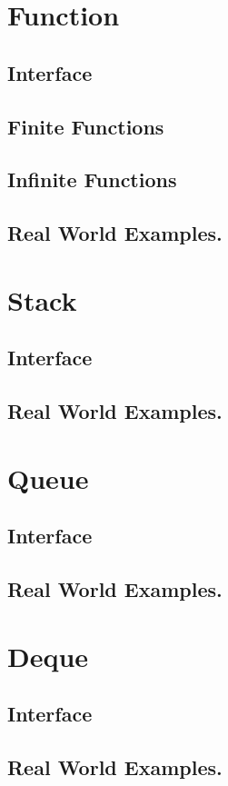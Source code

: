 \documentclass[12pt, letterpaper]{book}
\begin{document}
\section{Function}
	\subsection{Interface}
	\subsection{Finite Functions}
	\subsection{Infinite Functions}
	\subsection{Real World Examples.}
\section{Stack}
	\subsection{Interface}
	\subsection{Real World Examples.}
\section{Queue}
	\subsection{Interface}
	\subsection{Real World Examples.}
\section{Deque}
	\subsection{Interface}
	\subsection{Real World Examples.}
\end{document}
